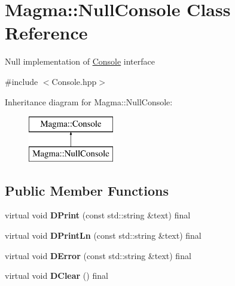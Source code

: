 \hypertarget{class_magma_1_1_null_console}{}\section{Magma\+:\+:Null\+Console Class Reference}
\label{class_magma_1_1_null_console}


Null implementation of \hyperlink{class_magma_1_1_console}{Console} interface  




{\ttfamily \#include $<$Console.\+hpp$>$}

Inheritance diagram for Magma\+:\+:Null\+Console\+:\begin{figure}[H]
\begin{center}
\leavevmode
\includegraphics[height=2.000000cm]{class_magma_1_1_null_console}
\end{center}
\end{figure}
\subsection*{Public Member Functions}
\begin{DoxyCompactItemize}
\item 
\mbox{\label{class_magma_1_1_null_console_a0ede89f63242d86719b73dbf19fb2fdb}} 
virtual void {\bfseries D\+Print} (const std\+::string \&text) final
\item 
\mbox{\label{class_magma_1_1_null_console_a673f778c29304e00fe095946a830f5f2}} 
virtual void {\bfseries D\+Print\+Ln} (const std\+::string \&text) final
\item 
\mbox{\label{class_magma_1_1_null_console_a4d514efc9382dd835bd04e479f545f44}} 
virtual void {\bfseries D\+Error} (const std\+::string \&text) final
\item 
\mbox{\label{class_magma_1_1_null_console_aa6995f1e59cce164ffbebe4c217fe652}} 
virtual void {\bfseries D\+Clear} () final
\end{DoxyCompactItemize}
